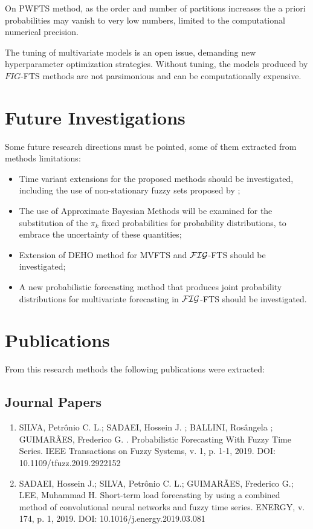 On PWFTS method, as the order and number of partitions increases the a priori probabilities may vanish to very low numbers, limited to the computational numerical precision.

The tuning of multivariate models is an open issue, demanding new hyperparameter optimization strategies. Without tuning, the models produced by $FIG$-FTS methods are not parsimonious and can be computationally expensive.


\section{Future Investigations}

Some future research directions must be pointed, some of them extracted from methods limitations:

\begin{itemize}
    \item Time variant extensions for the proposed methods should be investigated, including the use of non-stationary fuzzy sets proposed by \cite{Garibaldi2008};
    \item The use of Approximate Bayesian Methods will be examined for the substitution of the $\pi_k$ fixed probabilities for probability distributions, to embrace the uncertainty of these quantities;
    \item Extension of DEHO method for MVFTS and $\mathcal{FIG}$-FTS should be investigated;
    \item A new probabilistic forecasting method that produces joint probability distributions for multivariate forecasting in $\mathcal{FIG}$-FTS should be investigated.
\end{itemize}


\section{Publications}

From this research methods the following publications were extracted:

\subsection{Journal Papers}
\begin{enumerate}
    \item SILVA, Petrônio C. L.; SADAEI, Hossein J. ; BALLINI, Rosângela ; GUIMARÃES, Frederico G. . Probabilistic Forecasting With Fuzzy Time Series. IEEE Transactions on Fuzzy Systems, v. 1, p. 1-1, 2019. DOI: 10.1109/tfuzz.2019.2922152 \nocite{Silva2019b}
    \item SADAEI, Hossein J.; SILVA, Petrônio C. L.; GUIMARÃES, Frederico G.; LEE, Muhammad H. Short-term load forecasting by using a combined method of convolutional neural networks and fuzzy time series. ENERGY, v. 174, p. 1, 2019. DOI: 10.1016/j.energy.2019.03.081\nocite{Sadaei2019}
\end{enumerate}

